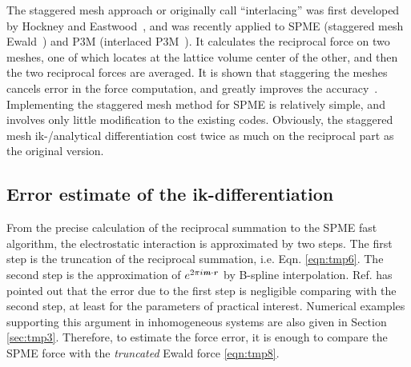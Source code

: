 \documentclass[aps,pre,preprint]{revtex4}
\renewcommand{\v}[1]{\textbf{\textit{#1}}}
\begin{document}
The staggered mesh approach or originally call ``interlacing'' was first
developed by Hockney and Eastwood~\cite{hockney1988computer}, and was
recently applied to SPME (staggered mesh Ewald~\cite{cerutti2009staggered})
and P3M (interlaced P3M~\cite{neelov2010interlaced}).
It calculates the
reciprocal force on two meshes,
one of which locates at the lattice volume center
of the other, and then the two reciprocal forces are averaged.
It is shown that staggering the meshes
cancels error in the force computation, and greatly improves the
accuracy~\cite{cerutti2009staggered, neelov2010interlaced}.
Implementing the staggered mesh method for SPME is
relatively simple, and involves only little modification to the
existing codes.
Obviously, the staggered mesh ik-/analytical differentiation
cost twice as much on the
reciprocal part as the original version.

\subsection{Error estimate of the ik-differentiation}
\label{sec:error-ik}

From the precise calculation of the reciprocal summation to the SPME
fast algorithm, the electrostatic interaction is approximated by two
steps.  The first step is the truncation of the reciprocal summation,
i.e. Eqn. \eqref{eqn:tmp6}. The second step is the approximation of
$e^{2\pi i\v m\cdot\v r}$ by B-spline
interpolation. Ref. \cite{wang2010optimizing} has pointed out that the
error due to the first step is negligible comparing with the second
step, at least for the parameters of practical interest. Numerical
examples supporting this argument in inhomogeneous systems are also
given in Section \ref{sec:tmp3}.  Therefore, to estimate the force
error, it is enough to compare the SPME force with the
\emph{truncated} Ewald force \eqref{eqn:tmp8}. 
\end{document}
